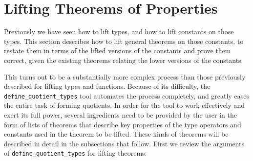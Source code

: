 \documentclass[envcountsame,runningheads]{llncs}
\begin{document}
%


%
\section{Lifting Theorems of Properties}
%
\label{liftingtheorems}

Previously we have seen how to lift types, and how to lift constants
on those types.  This section describes how to lift
general theorems
on those constants,
to restate them in terms of the lifted versions of
the constants and prove them correct,
given the existing theorems relating the lower versions of the constants.

This turns out to be a substantially more complex process than
those previously described for lifting types and functions.
Because of its difficulty, the {\tt define\_quotient\_types} tool
automates the process completely,
and greatly eases the entire task of forming quotients.
In order for the tool to work effectively and
exert its full power, several ingredients need to be provided
by the user in the form of lists of theorems that describe
key properties of the type operators and constants used
in the theorem to be lifted.  These kinds of theorems will be
described in detail in the subsections that follow.
First we
review the arguments of
{\tt define\_quotient\_types}
for lifting theorems.
\end{document}
